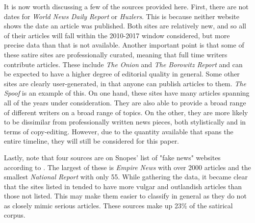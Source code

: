 \documentclass [12 pt] {report}
\begin{document}
It is now worth discussing a few of the sources provided here. First, there are not dates for \textit{World News Daily Report} or \textit{Huzlers}. This is because neither website shows the date an article was published. Both sites are relatively new, and so all of their articles will fall within the 2010-2017 window considered, but more precise data than that is not available. Another important point is that some of these satire sites are professionally curated, meaning that full time writers contribute articles. These include \textit{The Onion} and \textit{The Borowitz Report} and can be expected to have a higher degree of editorial quality in general. Some other sites are clearly user-generated, in that anyone can publish articles to them. \textit{The Spoof} is an example of this. On one hand, these sites have many articles spanning all of the years under consideration. They are also able to provide a broad range of different writers on a broad range of topics. On the other, they are more likely to be dissimilar from professionally written news pieces, both stylistically and in terms of copy-editing. However, due to the quantity available that spans the entire timeline, they will still be considered for this paper.

Lastly, note that four sources are on Snopes' list of "fake news" websites according to \cite{LaCapria}. The largest of these is \textit{Empire News} with over 2000 articles and the smallest \textit{National Report} with only 55. While gathering the data, it became clear that the sites listed in \cite{LaCapria} tended to have more vulgar and outlandish articles than those not listed. This may make them easier to classify in general as they do not as closely mimic serious articles. These sources make up 23$\%$ of the satirical corpus.
\end{document}
